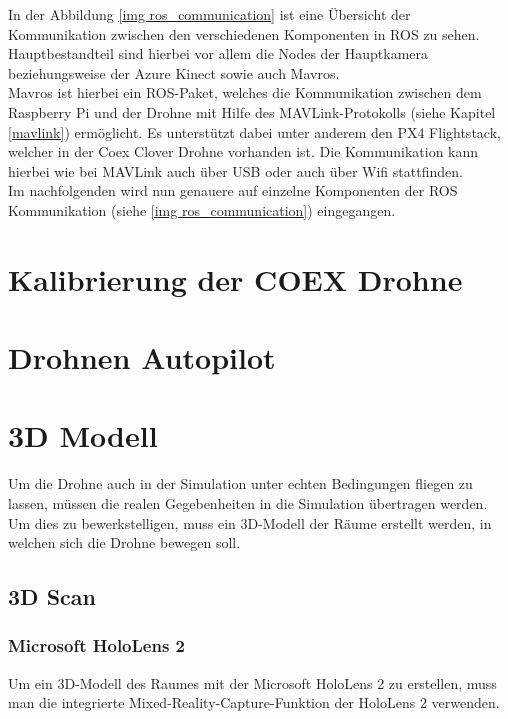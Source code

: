 In der Abbildung \ref{img ros_communication} ist eine Übersicht der Kommunikation zwischen den verschiedenen Komponenten in \ac{ROS} zu sehen. \\
Hauptbestandteil sind hierbei vor allem die Nodes der Hauptkamera beziehungsweise der Azure Kinect sowie auch Mavros. \\
Mavros ist hierbei ein ROS-Paket, welches die Kommunikation zwischen dem Raspberry Pi und der Drohne mit Hilfe des MAVLink-Protokolls (siehe Kapitel \ref{mavlink}) ermöglicht. Es unterstützt dabei unter anderem den PX4 Flightstack, welcher in der Coex Clover Drohne vorhanden ist. Die Kommunikation kann hierbei wie bei MAVLink auch über \ac{USB} oder auch über Wifi stattfinden. \\
Im nachfolgenden wird nun genauere auf einzelne Komponenten der ROS Kommunikation (siehe \ref{img ros_communication}) eingegangen. \\



\section{Kalibrierung der COEX Drohne}

\section{Drohnen Autopilot}


\section{3D Modell}
Um die Drohne auch in der Simulation unter echten Bedingungen fliegen zu lassen, müssen die realen Gegebenheiten in die Simulation übertragen werden. Um dies zu bewerkstelligen, muss ein 3D-Modell der Räume erstellt werden, in welchen sich die Drohne bewegen soll.
    \subsection{3D Scan}

        \subsubsection{Microsoft HoloLens 2}
        Um ein 3D-Modell des Raumes mit der Microsoft HoloLens 2 zu erstellen, muss man die integrierte Mixed-Reality-Capture-Funktion der HoloLens 2 verwenden.
        
